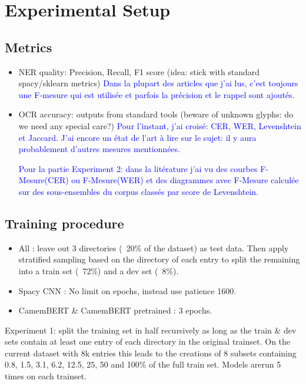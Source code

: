 \section{Experimental Setup}

\subsection{Metrics}
\begin{itemize}
    \item NER quality: Precision, Recall, F1 score (idea: stick with standard spacy/sklearn metrics) \textcolor{blue}{Dans la plupart des articles que j'ai lus, c'est toujours une F-mesure qui est utilisée et parfois la précision et le rappel sont ajoutés.}
    \item OCR accuracy: outputs from standard tools (beware of unknown glyphs: do we need any special care?) \textcolor{blue}{Pour l'instant, j'ai croisé: CER, WER, Levenshtein et Jaccard. J'ai encore un état de l'art à lire sur le sujet: il y aura probablement d'autres mesures mentionnées.}
    
    \textcolor{blue}{Pour la partie Experiment 2: dans la litérature j'ai vu des courbes F-Mesure(CER) ou F-Mesure(WER) et des diagrammes avec F-Mesure calculée sur des sous-ensembles du corpus classés par score de Levenshtein.}
\end{itemize}

\subsection{Training procedure}

\begin{itemize}
\item All : leave out 3 directories (~20\% of the dataset) as test data. Then apply stratified sampling based on the directory of each entry to split the remaining into a train set (~72\%) and a dev set (~8\%).
\item Spacy CNN : No limit on epochs, instead use patience 1600.
\item CamemBERT \& CamemBERT pretrained : 3 epochs.
\end{itemize}

Experiment 1: split the training set in half recursively as long as the train \& dev sets contain at least one entry of each directory in the original trainset. On the current dataset with 8k entries this leads to the creations of 8 subsets containing 0.8, 1.5, 3.1, 6.2, 12.5, 25, 50 and 100\% of the full train set. Models arerun 5 times on each trainset. 


